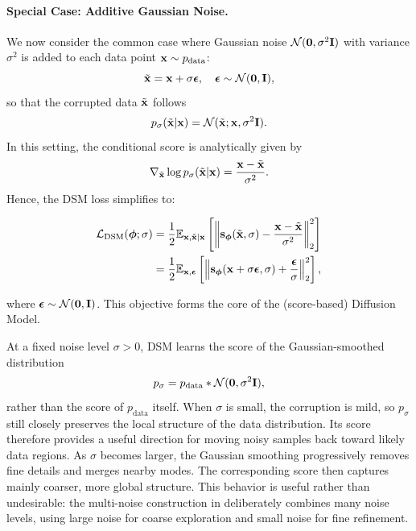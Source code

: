 \paragraph{Special Case: Additive Gaussian Noise.} We now consider the common case where Gaussian noise $\mathcal{N}(\mathbf{0}, \sigma^2 {\mathbf{I}})$ with variance $\sigma^2$ is added to each data point ${\mathbf{x}} \sim p_{\text{data}}$:
\[
\tilde{{\mathbf{x}}} = {\mathbf{x}} + \sigma \bm{\epsilon}, \quad \bm{\epsilon} \sim \mathcal{N}(\mathbf{0}, {\mathbf{I}}),
\]
so that the corrupted data $\tilde{{\mathbf{x}}}$ follows
\[
p_{\sigma}(\tilde{{\mathbf{x}}}|{\mathbf{x}}) = \mathcal{N}(\tilde{{\mathbf{x}}}; {\mathbf{x}}, \sigma^2 {\mathbf{I}}).
\]
In this setting, the conditional score is analytically given by
\[
\nabla_{\tilde{{\mathbf{x}}}} \log p_{\sigma}(\tilde{{\mathbf{x}}}|{\mathbf{x}}) = \frac{{\mathbf{x}} - \tilde{{\mathbf{x}}}}{\sigma^2}.
\]
Hence, the DSM loss simplifies to:
\begin{mdframed}
\begin{align}\label{eq:gaussian-dsm}
\begin{aligned}
    \mathcal{L}_{\text{DSM}}(\bm{\phi}; \sigma) &= \frac{1}{2} \mathbb{E}_{{\mathbf{x}}, \tilde{{\mathbf{x}}}|{\mathbf{x}}} \left[ \left\lVert{\mathbf{s}}_{\bm{\phi}}(\tilde{{\mathbf{x}}}, \sigma) - \frac{{\mathbf{x}} - \tilde{{\mathbf{x}}}}{\sigma^2}\right\rVert_2^2 \right] \\
    &= \frac{1}{2} \mathbb{E}_{{\mathbf{x}}, \bm{\epsilon}} \left[ \left\lVert{\mathbf{s}}_{\bm{\phi}}({\mathbf{x}} + \sigma \bm{\epsilon}, \sigma) + \frac{\bm{\epsilon}}{\sigma}\right\rVert_2^2 \right],
\end{aligned}
\end{align}
\end{mdframed}
where $\bm{\epsilon} \sim \mathcal{N}(\mathbf{0}, {\mathbf{I}})$. This objective forms the core of the (score-based) Diffusion Model. 


At a fixed noise level $\sigma>0$, DSM learns the score of the
Gaussian-smoothed distribution
\[
p_\sigma
=
p_{\mathrm{data}} * \mathcal{N}(\bm{0},\sigma^2{\mathbf{I}}),
\]
rather than the score of $p_{\mathrm{data}}$ itself.
When $\sigma$ is small, the corruption is mild, so $p_\sigma$ still closely
preserves the local structure of the data distribution. Its score therefore
provides a useful direction for moving noisy samples back toward likely data
regions. As $\sigma$ becomes larger, the Gaussian smoothing progressively removes fine
details and merges nearby modes. The corresponding score then captures mainly
coarser, more global structure. This behavior is useful rather than undesirable:
the multi-noise construction in  deliberately combines many noise
levels, using large noise for coarse exploration and small noise for fine
refinement.


